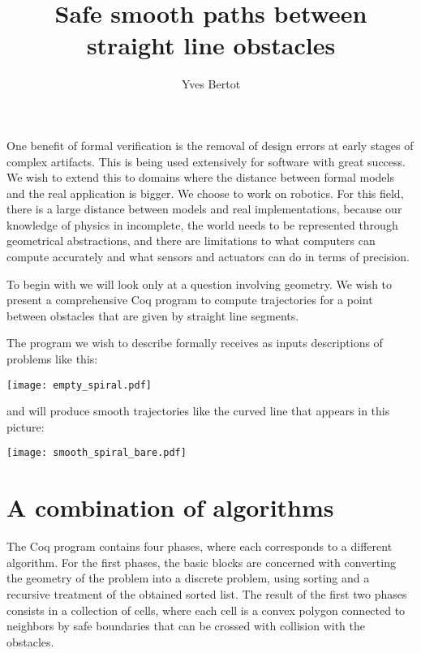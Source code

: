\documentclass{easychair}
\title{Safe smooth paths between straight line obstacles}
\author{Yves Bertot}
\institute{Inria Université Côte d'Azur}
\begin{document}
\maketitle

One benefit of formal verification is the removal of design errors at early
stages of complex artifacts.  This is being used extensively for software
with great success.  We wish to
extend this to domains where the distance between formal models and the
real application is bigger.  We choose to work on robotics.  For this
field, there is a large distance between models and real implementations,
because our knowledge of physics in incomplete,
the world needs to be represented through geometrical abstractions, and
there are limitations to what computers can compute accurately and what
sensors and actuators can do in terms of precision.

To begin with
we will look only at a question involving geometry.  
We wish to present a comprehensive Coq program
to compute trajectories for a point between obstacles that are given by straight
line segments.

The program we wish to describe formally receives as inputs descriptions of problems like this:
\begin{center}
\texttt{[image: empty\_spiral.pdf]}
\end{center}
and will produce smooth trajectories like the curved line that appears in this
picture:
\begin{center}
\texttt{[image: smooth\_spiral\_bare.pdf]}
\end{center}


\section{A combination of algorithms}
The Coq program contains four phases, where each corresponds to a different
algorithm.  For the first phases, the basic blocks are concerned with
converting the geometry of the problem into a discrete problem, using sorting
and a recursive treatment of the obtained sorted list.  The result of the
first two phases consists in a collection of cells, where each cell is
a convex polygon connected to neighbors by safe boundaries that can
be crossed with collision with the obstacles.
\end{document}
